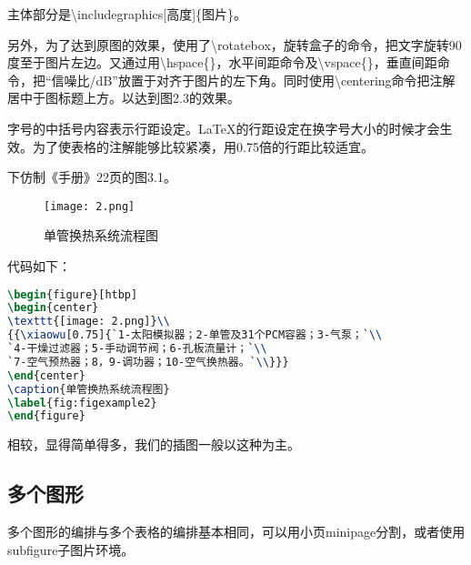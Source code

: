 主体部分是\textbackslash includegraphics[高度]\{图片\}。

另外，为了达到原图的效果，使用了\textbackslash rotatebox，旋转盒子的命令，把文字旋转90度至于图片左边。又通过用\textbackslash hspace\{\}，水平间距命令及\textbackslash vspace\{\}，垂直间距命令，把“信噪比/dB”放置于对齐于图片的左下角。同时使用\textbackslash centering命令把注解居中于图标题上方。以达到图2.3的效果。

字号的中括号内容表示行距设定。\LaTeX{}的行距设定在换字号大小的时候才会生效。为了使表格的注解能够比较紧凑，用0.75倍的行距比较适宜。

下仿制《手册》22页的图3.1。

\begin{figure}[htbp]
\begin{center}
\texttt{[image: 2.png]}\\
{{}}
\end{center}
\caption{单管换热系统流程图}
\label{fig:figexample2}
\end{figure}

代码如下：

\begin{lstlisting}[language=TeX]
\begin{figure}[htbp]
\begin{center}
\texttt{[image: 2.png]}\\
{{\xiaowu[0.75]{`1-太阳模拟器；2-单管及31个PCM容器；3-气泵；`\\
`4-干燥过滤器；5-手动调节阀；6-孔板流量计；`\\
`7-空气预热器；8，9-调功器；10-空气换热器。`\\}}}
\end{center}
\caption{单管换热系统流程图}
\label{fig:figexample2}
\end{figure}
\end{lstlisting}

相较，显得简单得多，我们的插图一般以这种为主。

\subsection{多个图形}
多个图形的编排与多个表格的编排基本相同，可以用小页minipage分割，或者使用subfigure子图片环境。

